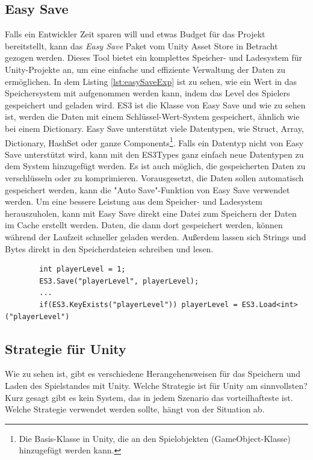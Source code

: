 \subsection{Easy Save}
Falls ein Entwickler Zeit sparen will und etwas Budget für das Projekt bereitstellt, kann das \textit{Easy Save} Paket vom Unity Asset Store in Betracht gezogen werden. Dieses Tool bietet ein komplettes Speicher- und Ladesystem für Unity-Projekte an, um eine einfache und effiziente Verwaltung der Daten zu ermöglichen.\cite{unityEasySave} In dem Listing \ref{lst:easySaveExp} ist zu sehen, wie ein Wert in das Speichersystem mit aufgenommen werden kann, indem das Level des Spielers gespeichert und geladen wird. ES3 ist die Klasse von Easy Save und wie zu sehen ist, werden die Daten mit einem Schlüssel-Wert-System gespeichert, ähnlich wie bei einem Dictionary.\cite{moodkieGettingStarted} Easy Save unterstützt viele Datentypen, wie Struct, Array, Dictionary, HashSet oder ganze Components\footnote{Die Basis-Klasse in Unity, die an den Spielobjekten (GameObject-Klasse) hinzugefügt werden kann.\cite{unityComponent}}.\cite{moodkieSupportedTypes} Falls ein Datentyp nicht von Easy Save unterstützt wird, kann mit den ES3Types ganz einfach neue Datentypen zu dem System hinzugefügt werden.\cite{moodkieChoosingWhat} Es ist auch möglich, die gespeicherten Daten zu verschlüsseln oder zu komprimieren.\cite{moodkieGettingStarted} Vorausgesetzt, die Daten sollen automatisch gespeichert werden, kann die "Auto Save"-Funktion von Easy Save verwendet werden.\cite{moodkieAutoSave} Um eine bessere Leistung aus dem Speicher- und Ladesystem herauszuholen, kann mit Easy Save direkt eine Datei zum Speichern der Daten im Cache erstellt werden. Daten, die dann dort gespeichert werden, können während der Laufzeit schneller geladen werden.\cite{moodkieImprovingPerformance} Außerdem lassen sich Strings und Bytes direkt in den Speicherdateien schreiben und lesen.\cite{moodkieSavingLoading} 

\begin{listing}[htp]
    \begin{verbatim} 
        int playerLevel = 1;
        ES3.Save("playerLevel", playerLevel);
        ... 
        if(ES3.KeyExists("playerLevel")) playerLevel = ES3.Load<int>("playerLevel")
    \end{verbatim}
    \caption{Speichern und Laden eines Integers mit Easy Save}
    \label{lst:easySaveExp}
\end{listing}



\subsection{Strategie für Unity}
Wie zu sehen ist, gibt es verschiedene Herangehensweisen für das Speichern und Laden des Spielstandes mit Unity. Welche Strategie ist für Unity am sinnvollsten? Kurz gesagt gibt es kein System, das in jedem Szenario das vorteilhafteste ist. Welche Strategie verwendet werden sollte, hängt von der Situation ab. 

